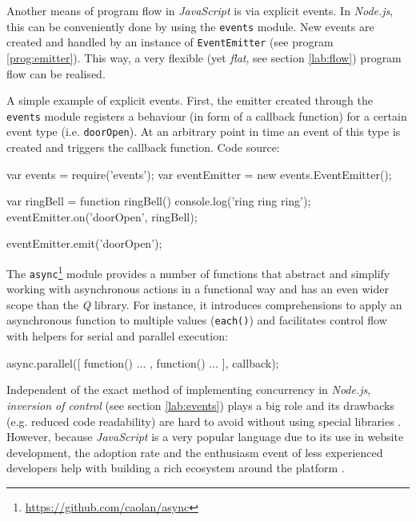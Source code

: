 Another means of program flow in \textit{JavaScript} is via explicit events. In \textit{Node.js}, this can be conveniently done by using the \texttt{events} module. New events are created and handled by an instance of \texttt{EventEmitter} (see program \ref{prog:emitter}). This way, a very flexible (yet \textit{flat}, see section \ref{lab:flow}) program flow can be realised.

\begin{program}
  \caption{A simple example of explicit events. First, the emitter created through the \texttt{events} module registers a behaviour (in form of a callback function) for a certain event type (i.e. \texttt{doorOpen}). At an arbitrary point in time an event of this type is created and triggers the callback function. Code source: \cite{Cogneau2013}}
  \label{prog:emitter}
  \begin{JavaCode}
var events = require('events');
var eventEmitter = new events.EventEmitter();
 
var ringBell = function ringBell()
{
    console.log('ring ring ring');
}
eventEmitter.on('doorOpen', ringBell);
 
eventEmitter.emit('doorOpen');
  \end{JavaCode}
\end{program}

The \texttt{async}\footnote{\url{https://github.com/caolan/async}} module provides a number of functions that abstract and simplify working with asynchronous actions in a functional way and has an even wider scope than the \textit{Q} library. For instance, it introduces comprehensions to apply an asynchronous function to multiple values (\texttt{each()}) and facilitates control flow with helpers for serial and parallel execution:

\begin{JavaCode}
async.parallel([
    function(){ ... },
    function(){ ... }
], callback);
\end{JavaCode}

Independent of the exact method of implementing concurrency in \textit{Node.js}, \textit{inversion of control} (see section \ref{lab:events}) plays a big role and its drawbacks (e.g. reduced code readability) are hard to avoid without using special libraries \cite[p. 93]{Erb2012}. However, because \textit{JavaScript} is a very popular language due to its use in website development, the adoption rate and the enthusiasm event of less experienced developers help with building a rich ecosystem around the platform \cite[p. 27]{Hughes-Croucher2012}.

